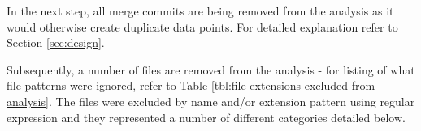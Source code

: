 In the next step, all merge commits are being removed from the analysis as it would otherwise create duplicate data points. For detailed explanation refer to Section \ref{sec:design}. 

Subsequently, a number of files are removed from the analysis - for listing of what file patterns were ignored, refer to Table \ref{tbl:file-extensions-excluded-from-analysis}. The files were excluded by name and/or extension pattern using regular expression and they represented a number of different categories detailed below. 
\begin{table}[!h]
\centering
\caption{Files excluded from the analysis by extension or suffix}
\label{tbl:file-extensions-excluded-from-analysis}


\end{table}
